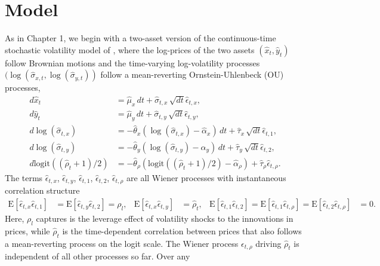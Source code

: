 \documentclass[10pt]{article}
\newcommand{\E}[1]{\mbox{E}\left[#1\right]}
\begin{document}
\section{Model}
As in Chapter 1, we begin with a two-asset version of the
continuous-time stochastic volatility model of \cite{hull1987pricing},
where the log-prices of the two assets $(\hat{x}_t, \hat{y}_t)$ follow
Brownian motions and the time-varying log-volatility processes
$(\log(\hat{\sigma}_{x,t}, \log(\hat{\sigma}_{y,t}))$ follow a
mean-reverting Ornstein-Uhlenbeck (OU) processes,
\begin{align}
  d\hat{x}_t &= \hat{\mu}_x\, dt + \hat{\sigma}_{t,x}\, \sqrt{dt} \hat{\epsilon}_{t,x}  ,  \label{eq:price_evo-x} \\
  d\hat{y}_t &= \hat{\mu}_y\, dt + \hat{\sigma}_{t,y}\, \sqrt{dt} \hat{\epsilon}_{t,y}  ,  \label{eq:price_evo-y} \\
  d\log( \hat{ \sigma }_{t,x}) &= -\hat{\theta}_x ( \log(\hat{\sigma}_{t,x} ) - \hat{\alpha}_x )\, dt + \hat{\tau}_x\, \sqrt{dt} \hat{\epsilon}_{t,1}  ,  \label{eq:vol_evo-x} \\
  d\log( \hat{ \sigma }_{t,y}) &= -\hat{\theta}_y ( \log(\hat{\sigma}_{t,y} ) - \hat{\alpha}_y )\, dt + \hat{\tau}_y\, \sqrt{dt} \hat{\epsilon}_{t,2}  ,  \label{eq:vol_evo-y} \\
  d\mbox{logit}((\hat{\rho}_{t} + 1)/2) &= -\hat{\theta}_\rho\left(\mbox{logit}((\hat{\rho}_{t}+1)/2) - \hat{\alpha}_\rho\right) + \hat{\tau}_{\rho} \hat{\epsilon}_{t,\rho}. \label{eq:correlation-evolution-continuous}
\end{align}
The terms $\hat{\epsilon}_{t,x}$, $\hat{\epsilon}_{t,y}$,
$\hat{\epsilon}_{t,1}$, $\hat{\epsilon}_{t,2}$, $\hat{\epsilon}_{t,\rho}$ are all Wiener
processes with instantaneous correlation structure 
\begin{align*}
  \E{\hat{\epsilon}_{t,x}\hat{\epsilon}_{t,1}} &= \E{\hat{\epsilon}_{t,y}\hat{\epsilon}_{t,2}} = \rho_{l}, & \E{\hat{\epsilon}_{t,x}\hat{\epsilon}_{t,y}} &= \hat{\rho}_t, & \E{\hat{\epsilon}_{t,1}\hat{\epsilon}_{t,2}} = \E{\hat{\epsilon}_{t,1}\hat{\epsilon}_{t,\rho}} = \E{\hat{\epsilon}_{t,2}\hat{\epsilon}_{t,\rho}} &= 0.
\end{align*}
Here, $\rho_l$ captures is the leverage effect of volatility shocks to
the innovations in prices, while $\hat{\rho}_t$ is the time-dependent
correlation between prices that also follows a mean-reverting process
on the logit scale. The Wiener process $\epsilon_{t,\rho}$ driving
$\hat{\rho}_t$ is independent of all other processes so far. Over any
\end{document}
